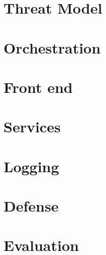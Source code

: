 \documentclass[letterpaper,twocolumn,10pt]{article}
\begin{document}
\section{Threat Model} \label{Threat Model}


\section{Orchestration}


\section{Front end}


\section{Services}


\section{Logging}


\section{Defense}



\section{Evaluation}


\end{document}
